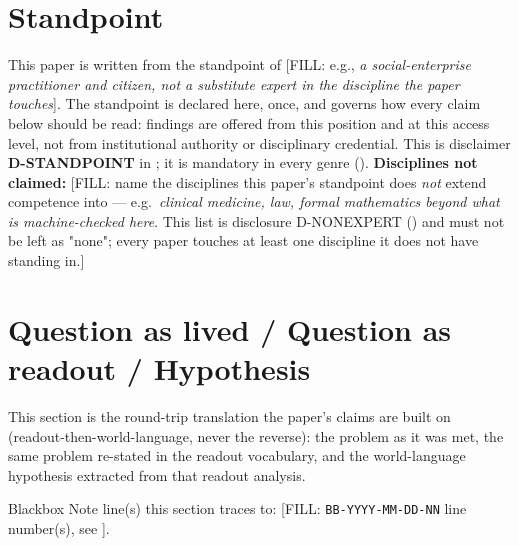 \documentclass[11pt]{article}
\begin{document}
\section{Standpoint}
\label{sec:standpoint}
This paper is written from the standpoint of [FILL: e.g., \emph{a social-enterprise
practitioner and citizen, not a substitute expert in the discipline the paper
touches}]. The standpoint is declared here, once, and governs how every claim
below should be read: findings are offered from this position and at this
access level, not from institutional authority or disciplinary credential.
This is disclaimer \textbf{D-STANDPOINT} in ; it is
mandatory in every genre (). \textbf{Disciplines not claimed:}
[FILL: name the disciplines this paper's standpoint does \emph{not} extend
competence into --- e.g.\ \emph{clinical medicine, law, formal mathematics
beyond what is machine-checked here}. This list is disclosure D-NONEXPERT
() and must not be left as "none"; every paper touches
at least one discipline it does not have standing in.]

\section{Question as lived / Question as readout / Hypothesis}
\label{sec:question-lens}
This section is the round-trip translation the paper's claims are built on
(readout-then-world-language, never the reverse): the problem as it was met,
the same problem re-stated in the readout vocabulary, and the world-language
hypothesis extracted from that readout analysis.
\begin{description}[style=nextline,leftmargin=1.4em,font=\bfseries]
  \item[Question as lived] [FILL: the human-language question exactly as
    first asked, verbatim, with a language tag, e.g.\ \emph{(th)} or
    \emph{(en)}. Do not polish it into academic register here.]
  \item[Question as readout] [FILL: the same question translated into the
    declared readout vocabulary --- access source, what that source
    distinguishes, what it does not (same-fiber) distinguish, and any
    contaminated concept it hides.]
  \item[Hypothesis] [FILL: the world-language hypothesis extracted from the
    readout analysis, plus its falsifier --- what observation would make this
    paper wrong.]
\end{description}
Blackbox Note line(s) this section traces to: [FILL: \texttt{BB-YYYY-MM-DD-NN}
line number(s), see ].
\end{document}
